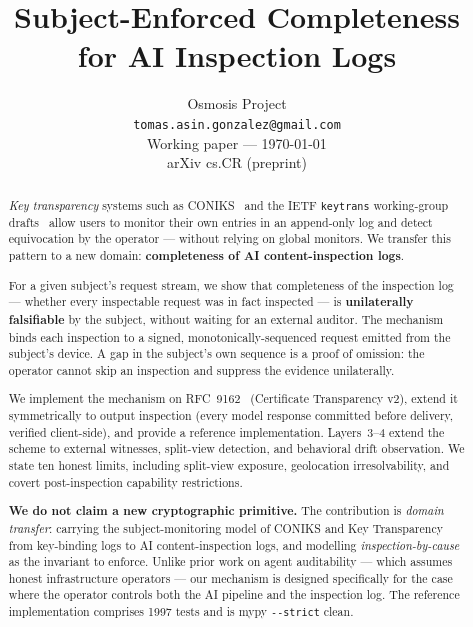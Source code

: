 \documentclass[11pt,a4paper]{article}
\begin{document}

\title{\textbf{Subject-Enforced Completeness\\for AI Inspection Logs}}

\author{Osmosis Project\\
\small \texttt{tomas.asin.gonzalez@gmail.com}\\[4pt]
\small Working paper --- \today\\
\small arXiv cs.CR (preprint)
}

\date{}
\maketitle

\begin{abstract}
\textit{Key transparency} systems such as CONIKS~\cite{coniks2015} and the IETF
\texttt{keytrans} working-group drafts~\cite{ietf-keytrans} allow users to monitor
their own entries in an append-only log and detect equivocation by the operator ---
without relying on global monitors. We transfer this pattern to a new domain:
\textbf{completeness of AI content-inspection logs}.

For a given subject's request stream, we show that completeness of the inspection log
--- whether every inspectable request was in fact inspected --- is \textbf{unilaterally
falsifiable} by the subject, without waiting for an external auditor. The mechanism
binds each inspection to a signed, monotonically-sequenced request emitted from the
subject's device. A gap in the subject's own sequence is a proof of omission: the
operator cannot skip an inspection and suppress the evidence unilaterally.

We implement the mechanism on RFC~9162~\cite{rfc9162} (Certificate Transparency v2),
extend it symmetrically to output inspection (every model response committed before
delivery, verified client-side), and provide a reference implementation. Layers~3--4
extend the scheme to external witnesses, split-view detection, and behavioral drift
observation. We state ten honest limits, including split-view exposure, geolocation
irresolvability, and covert post-inspection capability restrictions.

\textbf{We do not claim a new cryptographic primitive.} The contribution is
\textit{domain transfer}: carrying the subject-monitoring model of CONIKS and Key
Transparency from key-binding logs to AI content-inspection logs, and modelling
\textit{inspection-by-cause} as the invariant to enforce. Unlike prior work on
agent auditability --- which assumes honest infrastructure operators --- our mechanism
is designed specifically for the case where the operator controls both the AI pipeline
and the inspection log. The reference implementation comprises 1997 tests and is
mypy \texttt{-{}-strict} clean.
\end{abstract}
\end{document}
